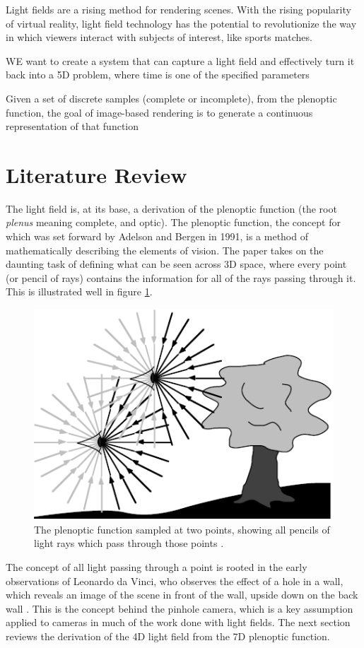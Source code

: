 \documentclass[12pt]{report}
\begin{document}
Light fields are a rising method for rendering scenes. With the rising popularity of virtual reality, light field technology has the potential to revolutionize the way in which viewers interact with subjects of interest, like sports matches.

WE want to create a system that can capture a light field and effectively turn it back into a 5D problem, where time is one of the specified parameters

Given a set of discrete samples (complete or incomplete), from the plenoptic function, the goal of image-based rendering is to generate a continuous representation of that function\cite{McMillan95}

\chapter*{Literature Review}
The light field is, at its base, a derivation of the plenoptic function (the root \emph{plenus} meaning complete, and optic). The plenoptic function, the concept for which was set forward by Adelson and Bergen in 1991, is a method of mathematically describing the elements of vision. The paper takes on the daunting task of defining what can be seen across 3D space, where every point (or pencil of rays) contains the information for all of the rays passing through it.  This is illustrated well in figure  \ref{fig:plenoptic_visual}. 
\begin{figure}[!ht]
	\centering
	\includegraphics[scale=0.75]{plenoptic_image.png}
	\caption{The plenoptic function sampled at two points, showing all pencils of light rays which pass through those points \cite{Adelson91}.}
	\label{fig:plenoptic_visual}
\end{figure}
The concept of all light passing through a point is rooted in the early observations of Leonardo da Vinci, who observes the effect of a hole in a wall, which reveals an image of the scene in front of the wall, upside down on the back wall \cite{Adelson91}. This is the concept behind the pinhole camera, which is a key assumption applied to cameras in much of the work done with light fields. The next section reviews the derivation of the 4D light field from the 7D plenoptic function.  
\end{document}
